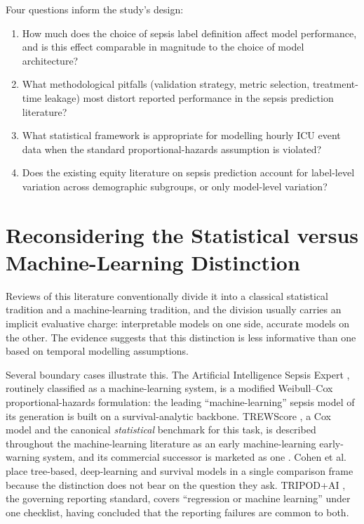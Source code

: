 Four questions inform the study's design:

\begin{enumerate}
    \item[\textbf{RQ1.}] How much does the choice of sepsis label definition
    affect model performance, and is this effect comparable in magnitude to
    the choice of model architecture?
    \item[\textbf{RQ2.}] What methodological pitfalls (validation strategy,
    metric selection, treatment-time leakage) most distort reported
    performance in the sepsis prediction literature?
    \item[\textbf{RQ3.}] What statistical framework is appropriate for
    modelling hourly ICU event data when the standard proportional-hazards
    assumption is violated?
    \item[\textbf{RQ4.}] Does the existing equity literature on sepsis
    prediction account for label-level variation across demographic subgroups,
    or only model-level variation?
\end{enumerate}


\section{Reconsidering the Statistical versus Machine-Learning Distinction}
\label{sec:false_dichotomy}

Reviews of this literature conventionally divide it into a classical
statistical tradition and a machine-learning tradition, and the division
usually carries an implicit evaluative charge: interpretable models on one
side, accurate models on the other. The evidence suggests that this distinction
is less informative than one based on temporal modelling assumptions.

Several boundary cases illustrate this. The Artificial Intelligence Sepsis Expert
\cite{nemati2018aise}, routinely classified as a machine-learning system, is a
modified Weibull--Cox proportional-hazards formulation: the leading
``machine-learning'' sepsis model of its generation is built on a
survival-analytic backbone. TREWScore \cite{henry2015trewscore}, a Cox model
and the canonical \emph{statistical} benchmark for this task, is described
throughout the machine-learning literature as an early machine-learning
early-warning system, and its commercial successor is marketed as one
\cite{adams2022trews}. Cohen et al.\ \cite{cohen2024subtle} place tree-based,
deep-learning and survival models in a single comparison frame because the
distinction does not bear on the question they ask. TRIPOD+AI
\cite{collins2024tripodai}, the governing reporting standard, covers
``regression or machine learning'' under one checklist, having concluded that
the reporting failures are common to both.

